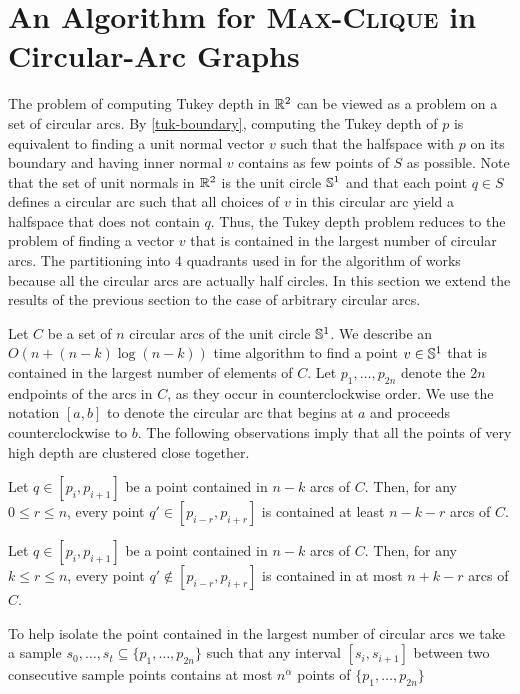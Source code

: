 \documentclass[charterfonts,lotsofwhite]{patmorin}
\begin{document}
\section{An Algorithm for \textsc{Max-Clique} in Circular-Arc Graphs}

The problem of computing Tukey depth in $\mathbb{R}^2$ can be viewed as a
problem on a set of circular arcs.  By \eqref{tuk-boundary}, computing
the Tukey depth of $p$ is equivalent to finding a unit normal vector
$v$ such that the halfspace with $p$ on its boundary and having inner
normal $v$ contains as few points of $S$ as possible.
Note that the set of unit normals in $\mathbb{R}^2$ is the unit circle $\mathbb{S}^1$
and that each point $q\in S$ defines a circular arc such that all
choices of $v$ in this circular arc yield a halfspace that does not
contain $q$.  Thus, the Tukey depth problem reduces to the problem of
finding a vector $v$ that is contained in the largest number of
circular arcs. The partitioning into 4 quadrants used in for the
algorithm of  works because all the circular arcs are
actually half circles.  In this section we extend the results of the
previous section to the case of arbitrary circular arcs.

Let $C$ be a set of $n$ circular arcs of the unit circle $\mathbb{S}^1$.  We
describe an $O(n+(n-k)\log (n-k))$ time algorithm to find a point
$v\in\mathbb{S}^1$ that is contained in the largest number of elements of
$C$.  Let $p_1,\ldots,p_{2n}$ denote the $2n$ endpoints of the arcs in
$C$, as they occur in counterclockwise order.  We use the notation
$[a,b]$ to denote the circular arc that begins at $a$ and proceeds
counterclockwise to $b$.  The following observations imply that all
the points of very high depth are clustered close together.

\begin{obs}
Let $q\in[p_i,p_{i+1}]$ be a point contained in $n-k$ arcs of $C$.
Then, for any $0\le r\le n$, every point $q'\in[p_{i-r},p_{i+r}]$ is
contained at least $n-k-r$ arcs of $C$.
\end{obs}

\begin{obs}
Let $q\in[p_i,p_{i+1}]$ be a point contained in $n-k$ arcs of $C$.
Then, for any $k \le r\le n$, every point $q'\notin[p_{i-r},p_{i+r}]$ 
is contained in at most $n+k-r$ arcs of $C$.
\end{obs}

To help isolate the point contained in the largest number of circular
arcs we take a sample $s_0,\ldots,s_t\subseteq \{p_1,\ldots,p_{2n}\}$
such that any interval $[s_i,s_{i+1}]$ between two consecutive sample
points contains at most $n^\alpha$ points of $\{p_1,\ldots,p_{2n}\}$
\end{document}

